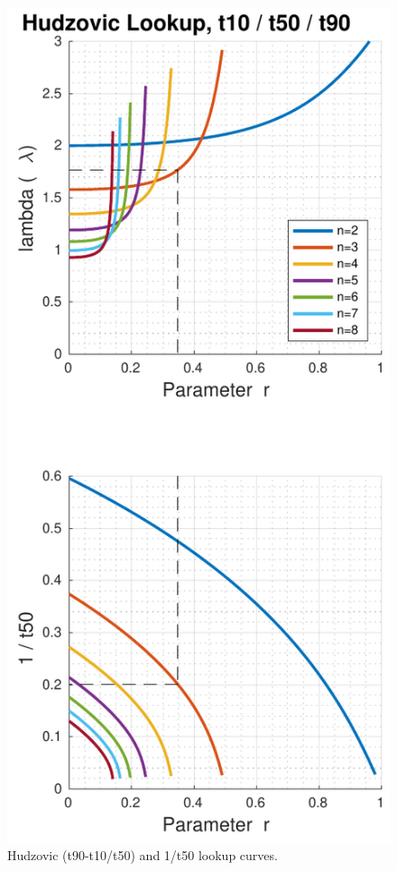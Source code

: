\begin{figure}
    \includegraphics[width=\linewidth]{images/hudzovic_curves_t10_t50_t90}
    \caption{Hudzovic (t90-t10/t50) and 1/t50 lookup curves.}
    \label{fig:hudzovic_t3}
\end{figure}
